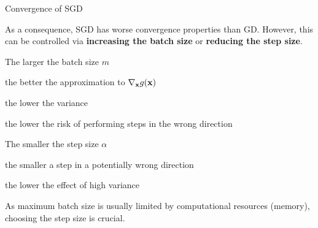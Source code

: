 \documentclass[11pt,compress,t,notes=noshow, xcolor=table]{beamer}
\begin{document}
\begin{vbframe}{Convergence of SGD}

	As a consequence, SGD has worse convergence properties than GD. However, this can be controlled via \textbf{increasing the batch size} or \textbf{reducing the step size}. 

	\begin{blocki}{The larger the batch size $m$}
		\item the better the approximation to $\nabla_{\mathbf{x}} g(\mathbf{x})$
		\item the lower the variance
		\item the lower the risk of performing steps in the wrong direction
	\end{blocki}

	\begin{blocki}{The smaller the step size $\alpha$}
		\item the smaller a step in a potentially wrong direction 
		\item the lower the effect of high variance
	\end{blocki}


As maximum batch size is usually limited by computational resources (memory), choosing the step size is crucial. 

\end{vbframe}


\endlecture
\end{document}
